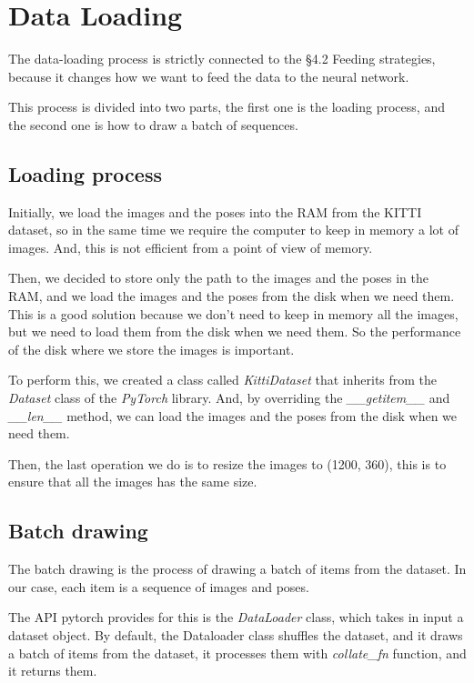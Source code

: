 \section{Data Loading}\label{sec:data-loading}
The data-loading process is strictly connected to the \S4.2 Feeding strategies, because it changes how we want to feed the data to the neural network.

This process is divided into two parts, the first one is the loading process, and the second one is how to draw a batch of sequences.

\subsection{Loading process}\label{subsec:loading-process}
Initially, we load the images and the poses into the RAM from the KITTI dataset, so in the same time we require the computer to keep in memory a lot of images.
And, this is not efficient from a point of view of memory.

Then, we decided to store only the path to the images and the poses in the RAM, and we load the images and the poses from the disk when we need them.
This is a good solution because we don't need to keep in memory all the images, but we need to load them from the disk when we need them.
So the performance of the disk where we store the images is important.

To perform this, we created a class called \textit{KittiDataset} that inherits from the \textit{Dataset} class of the \textit{PyTorch} library.
And, by overriding the \textit{\_\_getitem\_\_} and \textit{\_\_len\_\_} method, we can load the images and the poses from the disk when we need them.

Then, the last operation we do is to resize the images to (1200, 360), this is to ensure that all the images has the same size.

\subsection{Batch drawing}\label{subsec:batch-drawing}

The batch drawing is the process of drawing a batch of items from the dataset.
In our case, each item is a sequence of images and poses.

The API pytorch provides for this is the \textit{DataLoader} class, which takes in input a dataset object.
By default, the Dataloader class shuffles the dataset, and it draws a batch of items from the dataset, it processes them with \textit{collate\_fn} function, and it returns them.

